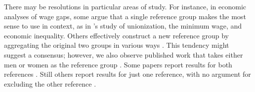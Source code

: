 There may be resolutions in particular areas of study.
For instance, in economic analyses of wage gaps, some argue that a single reference group makes the most sense to use in context, as in \citet{dinardoFortinLemieux1996}'s study of unionization, the minimum wage, and economic inequality.
Others effectively construct a new reference group by aggregating the original two groups in various ways \citep{neumark1988,oaxacaRansom1994,reimers1983,cotton1988,kassenboehmer2014distributional,sharafRashad2016,rahimiNazari2021,Allen2022,bachan2022genderchancellor}.
This tendency might suggest a consensus; however, we also observe published work that takes either men or women as the reference group \citep{nielsen2000wage,piazzalunga2019increase,leythienne2021paygapeu,tao2024gender,paradaContzen2025}.
Some papers report results for both references \citep{ONeill2006,fortinLemieuxFirpo2011,sharafRashad2016,rahimiNazari2021}. 
Still others report results for just one reference, with no argument for excluding the other reference \citep{zhang_2019, ayubiShahbaziKhazaei2024,paradaContzen2025,singleton2016,lamJamiesonMittinty2021,leythienne2021paygapeu,alHanawiNjagi2022,tao2024gender}.